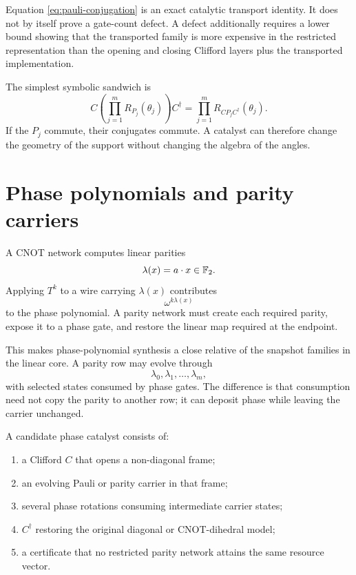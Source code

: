 \begin{provedbox}
Equation \eqref{eq:pauli-conjugation} is an exact catalytic transport identity.  It does not by itself prove a gate-count defect.  A defect additionally requires a lower bound showing that the transported family is more expensive in the restricted representation than the opening and closing Clifford layers plus the transported implementation.
\end{provedbox}

The simplest symbolic sandwich is
\[
C\left(\prod_{j=1}^m R_{P_j}(\theta_j)\right)C^\dagger
=
\prod_{j=1}^m R_{CP_jC^\dagger}(\theta_j).
\]
If the $P_j$ commute, their conjugates commute.  A catalyst can therefore change the geometry of the support without changing the algebra of the angles.

\section{Phase polynomials and parity carriers}
A CNOT network computes linear parities
\[
\lambda(x)=a\cdot x\in\mathbb F_2.
\]
Applying $T^k$ to a wire carrying $\lambda(x)$ contributes
\[
\omega^{k\lambda(x)}
\]
to the phase polynomial.  A parity network must create each required parity, expose it to a phase gate, and restore the linear map required at the endpoint.

This makes phase-polynomial synthesis a close relative of the snapshot families in the linear core.  A parity row may evolve through
\[
\lambda_0,\lambda_1,\ldots,\lambda_m,
\]
with selected states consumed by phase gates.  The difference is that consumption need not copy the parity to another row; it can deposit phase while leaving the carrier unchanged.

\begin{skeletonbox}
A candidate phase catalyst consists of:
\begin{enumerate}
\item a Clifford $C$ that opens a non-diagonal frame;
\item an evolving Pauli or parity carrier in that frame;
\item several phase rotations consuming intermediate carrier states;
\item $C^\dagger$ restoring the original diagonal or CNOT-dihedral model;
\item a certificate that no restricted parity network attains the same resource vector.
\end{enumerate}
\end{skeletonbox}

